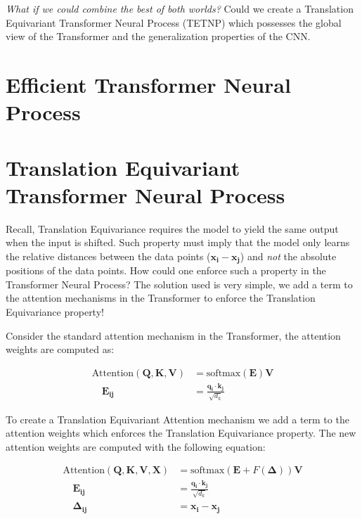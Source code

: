 \documentclass[../../main.tex]{subfiles}
\begin{document}
\emph{What if we could combine the best of both worlds?} Could we create a Translation Equivariant Transformer Neural Process (TETNP) which possesses the global view of the Transformer and the generalization properties of the CNN.


\section{Efficient Transformer Neural Process}



\section{Translation Equivariant Transformer Neural Process}
\label{sec:tetnp}

Recall, Translation Equivariance requires the model to yield the same output when the input is shifted. Such property must imply that the model only learns the relative distances between the data points ($\bm{x_i} - \bm{x_j}$) and \emph{not} the absolute positions of the data points. How could one enforce such a property in the Transformer Neural Process? The solution used is very simple, we add a term to the attention mechanisms in the Transformer to enforce the Translation Equivariance property!

Consider the standard attention mechanism in the Transformer, the attention weights are computed as:


\begin{align}
	\text{Attention}(\bm{Q}, \bm{K}, \bm{V}) &= \text{softmax}\left(\bm{E} \right) \bm{V}\\
	 \quad \bm{E_{ij}} &= \frac{\bm{q_i} \cdot \bm{k_j}}{\sqrt{d_k}}
\end{align}

To create a Translation Equivariant Attention mechanism we add a term to the attention weights which enforces the Translation Equivariance property. The new attention weights are computed with the following equation:

\begin{align}
	\label{eq:relative-attention}
	\text{Attention}(\bm{Q}, \bm{K}, \bm{V}, \bm{X}) &= \text{softmax}\left(\bm{E} + F(\bm{\Delta}) \right) \bm{V}\\
	\quad \bm{E_{ij}} &= \frac{\bm{q_i} \cdot \bm{k_j}}{\sqrt{d_k}}\\
	 \quad \bm{\Delta_{ij}} &= \bm{x_i} - \bm{x_j}
\end{align}
\end{document}
